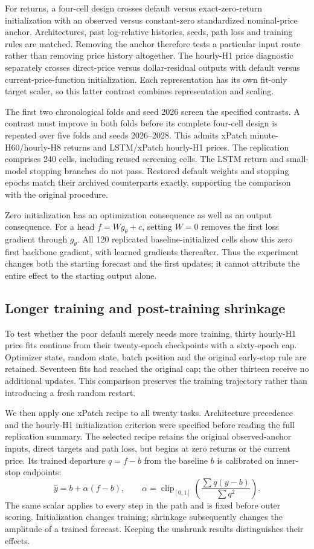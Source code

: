 For returns, a four-cell design crosses default versus exact-zero-return initialization with an observed versus constant-zero standardized nominal-price anchor. Architectures, past log-relative histories, seeds, path loss and training rules are matched. Removing the anchor therefore tests a particular input route rather than removing price history altogether. The hourly-H1 price diagnostic separately crosses direct-price versus dollar-residual outputs with default versus current-price-function initialization. Each representation has its own fit-only target scaler, so this latter contrast combines representation and scaling.

The first two chronological folds and seed 2026 screen the specified contrasts. A contrast must improve in both folds before its complete four-cell design is repeated over five folds and seeds 2026--2028. This admits xPatch minute-H60/hourly-H8 returns and LSTM/xPatch hourly-H1 prices. The replication comprises 240 cells, including reused screening cells. The LSTM return and small-model stopping branches do not pass. Restored default weights and stopping epochs match their archived counterparts exactly, supporting the comparison with the original procedure.

Zero initialization has an optimization consequence as well as an output consequence. For a head \(f=Wg_\theta+c\), setting \(W=0\) removes the first loss gradient through \(g_\theta\). All 120 replicated baseline-initialized cells show this zero first backbone gradient, with learned gradients thereafter. Thus the experiment changes both the starting forecast and the first updates; it cannot attribute the entire effect to the starting output alone.

\subsection{Longer training and post-training shrinkage}

To test whether the poor default merely needs more training, thirty hourly-H1 price fits continue from their twenty-epoch checkpoints with a sixty-epoch cap. Optimizer state, random state, batch position and the original early-stop rule are retained. Seventeen fits had reached the original cap; the other thirteen receive no additional updates. This comparison preserves the training trajectory rather than introducing a fresh random restart.

We then apply one xPatch recipe to all twenty tasks. Architecture precedence and the hourly-H1 initialization criterion were specified before reading the full replication summary. The selected recipe retains the original observed-anchor inputs, direct targets and path loss, but begins at zero returns or the current price. Its trained departure \(q=f-b\) from the baseline \(b\) is calibrated on inner-stop endpoints:
\[
\hat y=b+\alpha(f-b),\qquad
\alpha=\operatorname{clip}_{[0,1]}
             \left(\frac{\sum q(y-b)}{\sum q^2}\right).
\]
The same scalar applies to every step in the path and is fixed before outer scoring. Initialization changes training; shrinkage subsequently changes the amplitude of a trained forecast. Keeping the unshrunk results distinguishes their effects.

